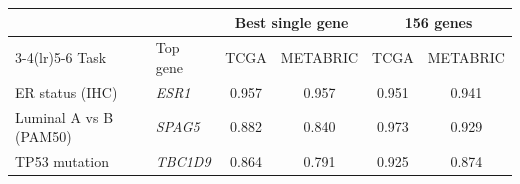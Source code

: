 \begin{tabular}{llcccc}
\toprule
 & & \multicolumn{2}{c}{Best single gene} & \multicolumn{2}{c}{156 genes} \\
\cmidrule(lr){3-4}\cmidrule(lr){5-6}
Task & Top gene & TCGA & METABRIC & TCGA & METABRIC \\
\midrule
ER status (IHC) & \textit{ESR1} & 0.957 & 0.957 & 0.951 & 0.941 \\
Luminal A vs B (PAM50) & \textit{SPAG5} & 0.882 & 0.840 & 0.973 & 0.929 \\
TP53 mutation & \textit{TBC1D9} & 0.864 & 0.791 & 0.925 & 0.874 \\
\bottomrule
\end{tabular}
